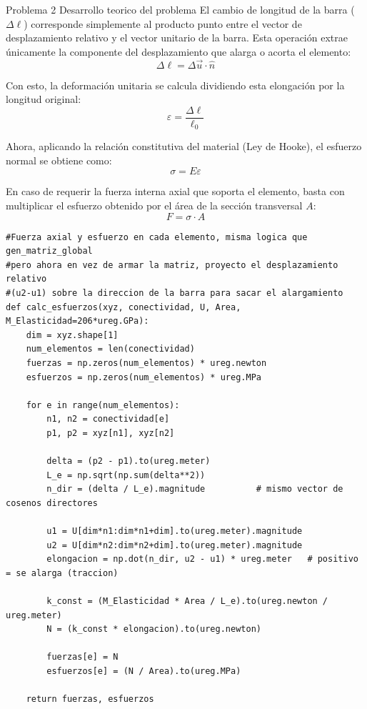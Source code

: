 \begin{desarrollo}{Problema 2 Desarrollo teorico del problema}
El cambio de longitud de la barra ($\Delta \ell$) corresponde simplemente al producto punto entre el vector de desplazamiento relativo y el vector unitario de la barra. Esta operación extrae únicamente la componente del desplazamiento que alarga o acorta el elemento:
$$\Delta \ell = \Delta \vec{u} \cdot \hat{n}$$

Con esto, la deformación unitaria se calcula dividiendo esta elongación por la longitud original:
$$\varepsilon = \dfrac{\Delta \ell}{\ell_0}$$

Ahora, aplicando la relación constitutiva del material (Ley de Hooke), el esfuerzo normal se obtiene como:
$$\sigma = E\varepsilon$$

En caso de requerir la fuerza interna axial que soporta el elemento, basta con multiplicar el esfuerzo obtenido por el área de la sección transversal $A$:
$$F = \sigma \cdot A$$

\begin{lstlisting}[style=pythonstyle, caption={Cálculo de fuerza axial y esfuerzo por elemento}, label={lst:calc_esfuerzos}]
#Fuerza axial y esfuerzo en cada elemento, misma logica que gen_matriz_global
#pero ahora en vez de armar la matriz, proyecto el desplazamiento relativo
#(u2-u1) sobre la direccion de la barra para sacar el alargamiento
def calc_esfuerzos(xyz, conectividad, U, Area, M_Elasticidad=206*ureg.GPa):
    dim = xyz.shape[1]
    num_elementos = len(conectividad)
    fuerzas = np.zeros(num_elementos) * ureg.newton
    esfuerzos = np.zeros(num_elementos) * ureg.MPa

    for e in range(num_elementos):
        n1, n2 = conectividad[e]
        p1, p2 = xyz[n1], xyz[n2]

        delta = (p2 - p1).to(ureg.meter)
        L_e = np.sqrt(np.sum(delta**2))
        n_dir = (delta / L_e).magnitude          # mismo vector de cosenos directores

        u1 = U[dim*n1:dim*n1+dim].to(ureg.meter).magnitude
        u2 = U[dim*n2:dim*n2+dim].to(ureg.meter).magnitude
        elongacion = np.dot(n_dir, u2 - u1) * ureg.meter   # positivo = se alarga (traccion)

        k_const = (M_Elasticidad * Area / L_e).to(ureg.newton / ureg.meter)
        N = (k_const * elongacion).to(ureg.newton)

        fuerzas[e] = N
        esfuerzos[e] = (N / Area).to(ureg.MPa)

    return fuerzas, esfuerzos
\end{lstlisting}
\end{desarrollo}





